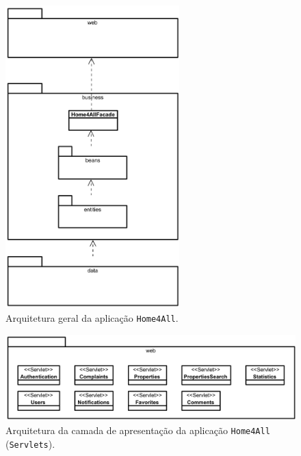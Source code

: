 \begin{figure}[H]
    \centering
    \includegraphics[width=0.6\textwidth]{images/PSM_General.png}
    \caption{Arquitetura geral da aplicação \texttt{Home4All}.}
    \label{fig:psm_general}
\end{figure}

\begin{figure}[H]
    \centering
    \includegraphics[width=\textwidth]{images/PSM_Presentation.png}
    \caption{Arquitetura da camada de apresentação da aplicação \texttt{Home4All} (\texttt{Servlets}).}
    \label{fig:psm_presentation}
\end{figure}

